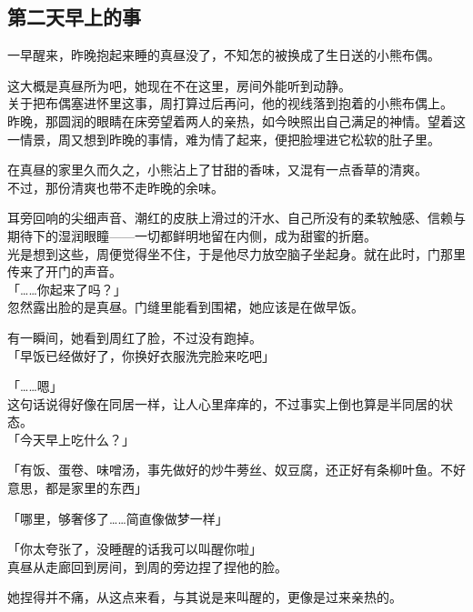 \subsection{第二天早上的事}

一早醒来，昨晚抱起来睡的真昼没了，不知怎的被换成了生日送的小熊布偶。

这大概是真昼所为吧，她现在不在这里，房间外能听到动静。\\

关于把布偶塞进怀里这事，周打算过后再问，他的视线落到抱着的小熊布偶上。\\

昨晚，那圆润的眼睛在床旁望着两人的亲热，如今映照出自己满足的神情。望着这一情景，周又想到昨晚的事情，难为情了起来，便把脸埋进它松软的肚子里。

在真昼的家里久而久之，小熊沾上了甘甜的香味，又混有一点香草的清爽。\\

不过，那份清爽也带不走昨晚的余味。

耳旁回响的尖细声音、潮红的皮肤上滑过的汗水、自己所没有的柔软触感、信赖与期待下的湿润眼瞳——一切都鲜明地留在内侧，成为甜蜜的折磨。\\

光是想到这些，周便觉得坐不住，于是他尽力放空脑子坐起身。就在此时，门那里传来了开门的声音。\\

「……你起来了吗？」\\

忽然露出脸的是真昼。门缝里能看到围裙，她应该是在做早饭。

有一瞬间，她看到周红了脸，不过没有跑掉。\\

「早饭已经做好了，你换好衣服洗完脸来吃吧」

「……嗯」\\

这句话说得好像在同居一样，让人心里痒痒的，不过事实上倒也算是半同居的状态。\\

「今天早上吃什么？」

「有饭、蛋卷、味噌汤，事先做好的炒牛蒡丝、奴豆腐，还正好有条柳叶鱼。不好意思，都是家里的东西」

「哪里，够奢侈了……简直像做梦一样」

「你太夸张了，没睡醒的话我可以叫醒你啦」\\

真昼从走廊回到房间，到周的旁边捏了捏他的脸。

她捏得并不痛，从这点来看，与其说是来叫醒的，更像是过来亲热的。\\

